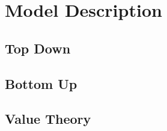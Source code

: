 \section{Model Description}\label{sec:model_descriptions}
\subsection{Top Down}\label{subsec:model_descriptions_top_down}
\subsection{Bottom Up}\label{subsec:model_descriptions_bottom_up}
\subsection{Value Theory}\label{subsec:model_descriptions_value_theory}